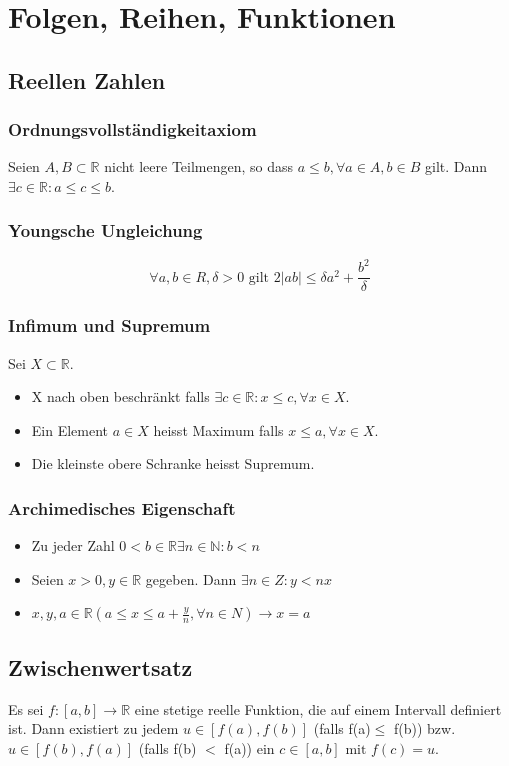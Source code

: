 \documentclass[a4paper, 9pt, DIV=24]{scrartcl}
\newcommand{\N}{\mathbb{N}}
\newcommand{\R}{\mathbb{R}}
\begin{document}
\clearpage
\section{Folgen, Reihen, Funktionen}
\subsection{Reellen Zahlen}
\subsubsection{Ordnungsvollständigkeitaxiom}
Seien $A, B \subset \R$ nicht leere Teilmengen, so dass $a\leq b, \forall a \in A, b \in B$ gilt. Dann $\exists c \in \R : a\leq c \leq b$.
\subsubsection{Youngsche Ungleichung}
$$\forall a, b \in R, \delta >0 \mbox{ gilt } 2|ab|\leq \delta a^2+\frac{b^2}{\delta}$$
\subsubsection{Infimum und Supremum}
Sei $X \subset \R$.
\begin{itemize}
\item X nach oben beschränkt falls $\exists c \in \R : x\leq c, \forall x \in X$.
\item Ein Element $a \in X$ heisst Maximum falls $x\leq a, \forall x \in X$.
\item Die kleinste obere Schranke heisst Supremum.
\end{itemize}
\subsubsection{Archimedisches Eigenschaft}
\begin{itemize}
\item Zu jeder Zahl $0 < b \in \R \exists n \in \N : b<n$
\item Seien $x>0, y \in \R $ gegeben. Dann $\exists n \in Z : y<nx$
\item $x,y,a \in \R (a\leq x \leq a+\frac{y}{n}, \forall n \in N) \rightarrow x=a$
\end{itemize}
\subsection{Zwischenwertsatz}
Es sei $f: [a,b] \to \R$ eine stetige reelle Funktion, die auf einem Intervall definiert ist. Dann existiert zu jedem $u\in [f(a), f(b)]$ (falls f(a)$\leq$ f(b)) bzw. $u\in [f(b), f(a)]$ (falls f(b) $<$ f(a)) ein $c\in [a,b] \mbox{ mit } f\left(c\right)=u$.
\end{document}
